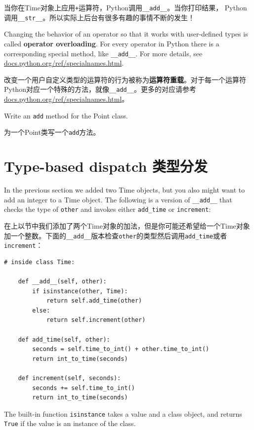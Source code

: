\documentclass[10pt]{book}
\begin{document}
\begin{CJK}{UTF8}{gbsn}
当你在Time对象上应用{\tt +}运算符，Python调用\verb"__add__"。当你打印结果，
Python调用\verb"__str__"。所以实际上后台有很多有趣的事情不断的发生！

Changing the behavior of an operator so that it works with
user-defined types is called {\bf operator overloading}.  For every
operator in Python there is a corresponding special method, like 
\verb"__add__".  For more details, see
\url{docs.python.org/ref/specialnames.html}.

改变一个用户自定义类型的运算符的行为被称为{\bf 运算符重载}。对于每一个运算符
Python对应一个特殊的方法，就像\verb"__add__"。更多的对应请参考
\url{docs.python.org/ref/specialnames.html}。

\begin{exercise}

Write an {\tt add} method for the Point class.  

为一个Point类写一个{\tt add}方法。

\end{exercise}


\section{Type-based dispatch 类型分发}

In the previous section we added two Time objects, but you
also might want to add an integer to a Time object.  The
following is a version of \verb"__add__"
that checks the type of {\tt other} and invokes either
\verb"add_time" or {\tt increment}:

在上以节中我们添加了两个Time对象的加法，但是你可能还希望给一个Time对象加一个整数。下面的\verb"__add__"版本检查{\tt other}的类型然后调用\verb"add_time"或者{\tt increment}：

\begin{verbatim}
# inside class Time:

    def __add__(self, other):
        if isinstance(other, Time):
            return self.add_time(other)
        else:
            return self.increment(other)

    def add_time(self, other):
        seconds = self.time_to_int() + other.time_to_int()
        return int_to_time(seconds)

    def increment(self, seconds):
        seconds += self.time_to_int()
        return int_to_time(seconds)
\end{verbatim}
%
The built-in function {\tt isinstance} takes a value and a
class object, and returns {\tt True} if the value is an instance
of the class.


\end{CJK}
\end{document}
